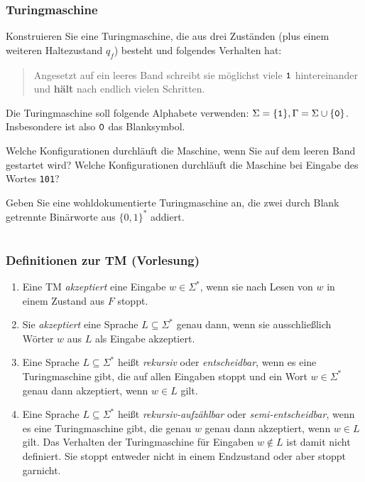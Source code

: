 \documentclass{beamer}
\begin{document}
\begin{frame}
\frametitle{Turingmaschine}
 \label{sec:busy_beaver}

Konstruieren Sie eine Turingmaschine, die aus drei Zuständen (plus einem
weiteren Haltezustand $q_f$) besteht und folgendes Verhalten hat:
\begin{quote}
  Angesetzt auf ein leeres Band schreibt sie möglichst viele ${\tt 1}$
  hintereinander und \textbf{hält} nach endlich vielen Schritten.
\end{quote}
Die Turingmaschine soll folgende Alphabete verwenden: $\Sigma = \{{\tt 1}\},
\Gamma = \Sigma \cup \{{\tt 0}\}$.  Insbesondere ist also ${\tt 0}$ das
Blanksymbol.

Welche Konfigurationen durchläuft die Maschine, wenn Sie auf dem leeren Band
gestartet wird?  Welche Konfigurationen durchläuft die Maschine bei Eingabe
des Wortes {\tt 101}?
\end{frame}
\begin{frame}
 Geben Sie eine wohldokumentierte Turingmaschine an, die zwei durch Blank
getrennte Binärworte aus $\{0,1\}^*$ addiert.
\end{frame}

\section*{}
\begin{frame}
 \frametitle{Definitionen zur TM (Vorlesung)}
 \begin{enumerate}
  \item Eine TM \emph{akzeptiert} eine Eingabe $w \in \Sigma^*$, wenn sie nach Lesen von $w$ in einem Zustand aus $F$ stoppt.
  \item Sie \emph{akzeptiert} eine Sprache $L \subseteq \Sigma^*$ genau dann, wenn sie ausschließlich Wörter $w$ aus $L$ als Eingabe akzeptiert.
  \item Eine Sprache $L \subseteq \Sigma^*$ heißt \emph{rekursiv} oder \emph{entscheidbar}, wenn es eine Turingmaschine gibt, die auf allen Eingaben stoppt und
	ein Wort $w \in \Sigma^*$ genau dann akzeptiert, wenn $w \in L$ gilt.
  \item Eine Sprache $L \subseteq \Sigma^*$ heißt \emph{rekursiv-aufzählbar} oder \emph{semi-entscheidbar}, wenn es eine Turingmaschine gibt, 
	die genau $w$ genau dann akzeptiert, wenn $w \in L$ gilt. Das Verhalten der Turingmaschine für Eingaben $w \not\in L$ ist damit nicht definiert.
	Sie stoppt entweder nicht in einem Endzustand oder aber stoppt garnicht.
 \end{enumerate}
\end{frame}
\end{document}
